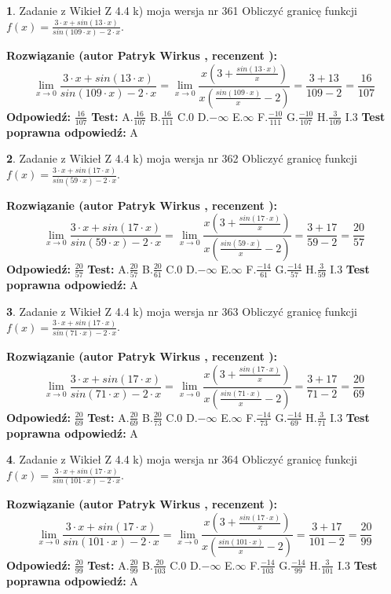 \documentclass[12pt, a4paper]{article}
\theoremstyle{definition} %
\newtheorem{zad}{}
\newcommand{\zadStart}[1]{\begin{zad}#1\newline}
\newcommand{\zadStop}{\end{zad}}
\newcommand{\rozwStart}[2]{\noindent \textbf{Rozwiązanie (autor #1 , recenzent #2): }\newline}
\newcommand{\rozwStop}{\newline}
\newcommand{\odpStart}{\noindent \textbf{Odpowiedź:}\newline}
\newcommand{\odpStop}{\newline}
\newcommand{\testStart}{\noindent \textbf{Test:}\newline}
\newcommand{\testStop}{\newline}
\newcommand{\kluczStart}{\noindent \textbf{Test poprawna odpowiedź:}\newline}
\newcommand{\kluczStop}{\newline}
\begin{document}
\zadStart{Zadanie z Wikieł Z 4.4 k) moja wersja nr 361}
Obliczyć granicę funkcji $f(x)=\frac{3\cdot x +sin(13\cdot x)}{sin(109\cdot x) -2\cdot x}$.
\zadStop
\rozwStart{Patryk Wirkus}{}
$$\lim\limits_{x\to 0}\frac{3\cdot x +sin(13\cdot x)}{sin(109\cdot x) -2\cdot x}
=\lim\limits_{x\to 0}\frac{x(3+\frac{sin(13\cdot x)}{x})}{x(\frac{sin(109\cdot x)}{x}-2)}
=\frac{3+13}{109-2} = \frac{16}{107}$$
\rozwStop
\odpStart
$\frac{16}{107}$
\odpStop
\testStart
A.$\frac{16}{107}$
B.$\frac{16}{111}$
C.$0$
D.$-\infty$
E.$\infty$
F.$\frac{-10}{111}$
G.$\frac{-10}{107}$
H.$\frac{3}{109}$
I.$3$
\testStop
\kluczStart
A
\kluczStop



\zadStart{Zadanie z Wikieł Z 4.4 k) moja wersja nr 362}
Obliczyć granicę funkcji $f(x)=\frac{3\cdot x +sin(17\cdot x)}{sin(59\cdot x) -2\cdot x}$.
\zadStop
\rozwStart{Patryk Wirkus}{}
$$\lim\limits_{x\to 0}\frac{3\cdot x +sin(17\cdot x)}{sin(59\cdot x) -2\cdot x}
=\lim\limits_{x\to 0}\frac{x(3+\frac{sin(17\cdot x)}{x})}{x(\frac{sin(59\cdot x)}{x}-2)}
=\frac{3+17}{59-2} = \frac{20}{57}$$
\rozwStop
\odpStart
$\frac{20}{57}$
\odpStop
\testStart
A.$\frac{20}{57}$
B.$\frac{20}{61}$
C.$0$
D.$-\infty$
E.$\infty$
F.$\frac{-14}{61}$
G.$\frac{-14}{57}$
H.$\frac{3}{59}$
I.$3$
\testStop
\kluczStart
A
\kluczStop



\zadStart{Zadanie z Wikieł Z 4.4 k) moja wersja nr 363}
Obliczyć granicę funkcji $f(x)=\frac{3\cdot x +sin(17\cdot x)}{sin(71\cdot x) -2\cdot x}$.
\zadStop
\rozwStart{Patryk Wirkus}{}
$$\lim\limits_{x\to 0}\frac{3\cdot x +sin(17\cdot x)}{sin(71\cdot x) -2\cdot x}
=\lim\limits_{x\to 0}\frac{x(3+\frac{sin(17\cdot x)}{x})}{x(\frac{sin(71\cdot x)}{x}-2)}
=\frac{3+17}{71-2} = \frac{20}{69}$$
\rozwStop
\odpStart
$\frac{20}{69}$
\odpStop
\testStart
A.$\frac{20}{69}$
B.$\frac{20}{73}$
C.$0$
D.$-\infty$
E.$\infty$
F.$\frac{-14}{73}$
G.$\frac{-14}{69}$
H.$\frac{3}{71}$
I.$3$
\testStop
\kluczStart
A
\kluczStop



\zadStart{Zadanie z Wikieł Z 4.4 k) moja wersja nr 364}
Obliczyć granicę funkcji $f(x)=\frac{3\cdot x +sin(17\cdot x)}{sin(101\cdot x) -2\cdot x}$.
\zadStop
\rozwStart{Patryk Wirkus}{}
$$\lim\limits_{x\to 0}\frac{3\cdot x +sin(17\cdot x)}{sin(101\cdot x) -2\cdot x}
=\lim\limits_{x\to 0}\frac{x(3+\frac{sin(17\cdot x)}{x})}{x(\frac{sin(101\cdot x)}{x}-2)}
=\frac{3+17}{101-2} = \frac{20}{99}$$
\rozwStop
\odpStart
$\frac{20}{99}$
\odpStop
\testStart
A.$\frac{20}{99}$
B.$\frac{20}{103}$
C.$0$
D.$-\infty$
E.$\infty$
F.$\frac{-14}{103}$
G.$\frac{-14}{99}$
H.$\frac{3}{101}$
I.$3$
\testStop
\kluczStart
A
\kluczStop
\end{document}
